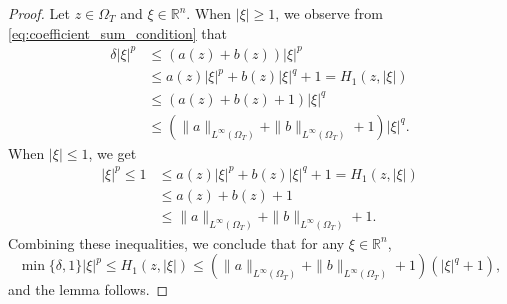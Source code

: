 \documentclass[11pt,oneside, english,reqno,twoside a4paper]{amsart}
\theoremstyle{definition}
\numberwithin{theorem}{section}
\numberwithin{equation}{section}
\begin{document}
\begin{proof}
    Let $z \in \Omega_T$ and $\xi \in \mathbb{R}^n$.
    When $|\xi| \geq 1$, we observe from \eqref{eq:coefficient_sum_condition} that
    \begin{align*}
        \delta |\xi|^p & \leq(a(z)+b(z))|\xi|^p \\
        &\leq a(z)|\xi|^p+b(z)|\xi|^q+1 = H_1(z,|\xi|) \\
        &\leq (a(z)+b(z)+1)|\xi|^q \\
        &\leq (\|a\|_{L^\infty(\Omega_T)}+\|b\|_{L^\infty(\Omega_T)}+1)|\xi|^q.
    \end{align*}
    When $|\xi| \leq 1$, we get
    \begin{align*}
        |\xi|^p\leq 1 &\leq a(z)|\xi|^p+b(z)|\xi|^q+1 = H_1(z,|\xi|) \\
         &\leq a(z)+b(z)+1\\
         &\leq \|a\|_{L^\infty(\Omega_T)}+\|b\|_{L^\infty(\Omega_T)}+1.
     \end{align*}
     Combining these inequalities, we conclude that for any $\xi \in \mathbb{R}^n$,
     \begin{equation*}
         \min\{\delta,1\}|\xi|^p\leq H_1(z,|\xi|)\leq (\|a\|_{L^\infty(\Omega_T)}+\|b\|_{L^\infty(\Omega_T)}+1)(|\xi|^q+1),
     \end{equation*}
     and the lemma follows.
\end{proof}
\end{document}
